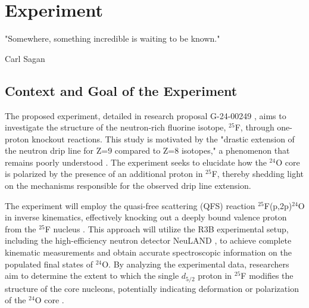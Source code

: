 
%

\makeatletter
\newcommand{\ntifpkgloaded}{%
  \@ifpackageloaded%
}
\makeatother


\chapter{Experiment}
\label{cha:experiment}

\epigraph{
	"Somewhere, something incredible is waiting to be known."
}{Carl Sagan}



\section{Context and Goal of the Experiment} %
\label{sec:contex_goal_experiment}

The proposed experiment, detailed in research proposal G-24-00249 \cite{panin2024neutron}, aims to investigate the structure of the neutron-rich fluorine isotope, $^{25}$F, through one-proton knockout reactions. This study is motivated by the "drastic extension of the neutron drip line for Z=9 compared to Z=8 isotopes," a phenomenon that remains poorly understood \cite{ahn_location_2019}. The experiment seeks to elucidate how the $^{24}$O core is polarized by the presence of an additional proton in $^{25}$F, thereby shedding light on the mechanisms responsible for the observed drip line extension.

The experiment will employ the quasi-free scattering (\gls{QFS}) reaction $^{25}$F(p,2p)$^{24}$O in inverse kinematics, effectively knocking out a deeply bound valence proton from the $^{25}$F nucleus \cite{panin_exclusive_2016}. This approach will utilize the R3B experimental setup, including the high-efficiency neutron detector NeuLAND \cite{boretzky_neuland_2021}, to achieve complete kinematic measurements and obtain accurate spectroscopic information on the populated final states of $^{24}$O. By analyzing the experimental data, researchers aim to determine the extent to which the single $d_{5/2}$ proton in $^{25}$F modifies the structure of the core nucleons, potentially indicating deformation or polarization of the $^{24}$O core \cite{macchiavelli_core_2020}.

